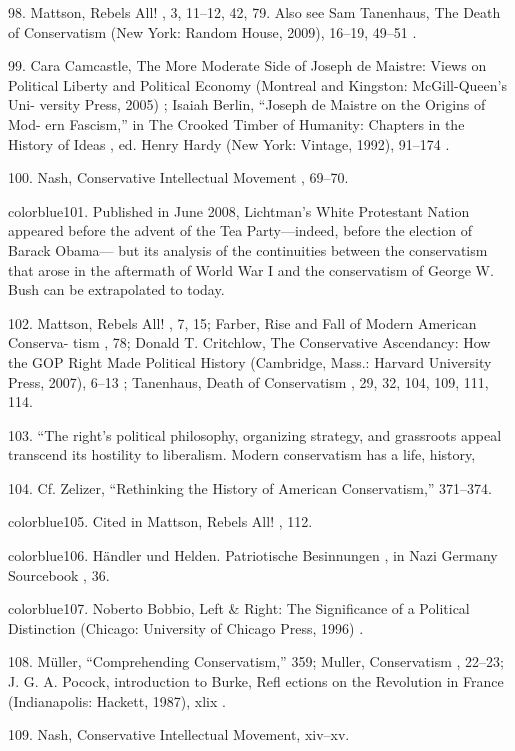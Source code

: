 	{\color{blue}98}. Mattson, Rebels All! , 3, 11–12, 42, 79. Also see Sam Tanenhaus, The Death of Conservatism (New York: Random House, 2009), 16–19, 49–51 .


	{\color{blue}99}. Cara Camcastle, The More Moderate Side of Joseph de Maistre: Views on Political Liberty and Political Economy (Montreal and Kingston: McGill-Queen’s Uni- versity Press, 2005) ; Isaiah Berlin, “Joseph de Maistre on the Origins of Mod- ern Fascism,” in The Crooked Timber of Humanity: Chapters in the History of Ideas , ed. Henry Hardy (New York: Vintage, 1992), 91–174 .


	{\color{blue}100}. Nash, Conservative Intellectual Movement , 69–70.


	{color{blue}101}. Published in June 2008, Lichtman’s White Protestant Nation appeared before the advent of the Tea Party—indeed, before the election of Barack Obama— but its analysis of the continuities between the conservatism that arose in the aftermath of World War I and the conservatism of George W. Bush can be extrapolated to today.


	{\color{blue}102}. Mattson, Rebels All! , 7, 15; Farber, Rise and Fall of Modern American Conserva- tism , 78; Donald T. Critchlow, The Conservative Ascendancy: How the GOP Right Made Political History (Cambridge, Mass.: Harvard University Press, 2007), 6–13 ; Tanenhaus, Death of Conservatism , 29, 32, 104, 109, 111, 114.


	{\color{blue}103}. “The right’s political philosophy, organizing strategy, and grassroots appeal transcend its hostility to liberalism. Modern conservatism has a life, history,


	{\color{blue}104}. Cf. Zelizer, “Rethinking the History of American Conservatism,” 371–374.


	{color{blue}105}. Cited in Mattson, Rebels All! , 112.


	{color{blue}106}. Händler und Helden. Patriotische Besinnungen , in Nazi Germany Sourcebook , 36.


	{color{blue}107}. Noberto Bobbio, Left & Right: The Significance of a Political Distinction (Chicago: University of Chicago Press, 1996) .


	{\color{blue}108}. Müller, “Comprehending Conservatism,” 359; Muller, Conservatism , 22–23; J. G. A. Pocock, introduction to Burke, Refl ections on the Revolution in France (Indianapolis: Hackett, 1987), xlix .


	{\color{blue}109}. Nash, Conservative Intellectual Movement, xiv–xv.


